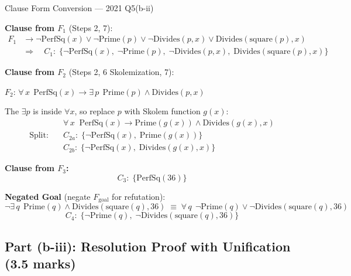 \documentclass[12pt,a4paper]{article}
\newcommand{\ALL}[1]{\forall\,#1\;}
\newcommand{\EX}[1]{\exists\,#1\;}
\newcommand{\ra}{\rightarrow}
\newcommand{\cl}[1]{\{#1\}}      %
\begin{document}
\begin{solbox}{Clause Form Conversion --- 2021 Q5(b-ii)}

\textbf{Clause from $F_1$} (Steps 2, 7):
\begin{align*}
  F_1 &\ra \neg\mathrm{PerfSq}(x) \lor \neg\mathrm{Prime}(p) \lor \neg\mathrm{Divides}(p,x) \lor \mathrm{Divides}(\mathrm{square}(p),x)\\
  &\Rightarrow \quad C_1: \;\cl{\neg\mathrm{PerfSq}(x),\;\neg\mathrm{Prime}(p),\;\neg\mathrm{Divides}(p,x),\;\mathrm{Divides}(\mathrm{square}(p),x)}
\end{align*}

\textbf{Clause from $F_2$} (Steps 2, 6 Skolemization, 7):

$F_2$: $\ALL{x}\,\mathrm{PerfSq}(x) \ra \EX{p}\,\mathrm{Prime}(p)\land\mathrm{Divides}(p,x)$

The $\exists p$ is inside $\forall x$, so replace $p$ with Skolem function $g(x)$:
\begin{align*}
  &\ALL{x}\;\mathrm{PerfSq}(x) \ra \mathrm{Prime}(g(x)) \land \mathrm{Divides}(g(x),x)\\
  \text{Split:}\quad
  &C_{2a}: \;\cl{\neg\mathrm{PerfSq}(x),\;\mathrm{Prime}(g(x))}\\
  &C_{2b}: \;\cl{\neg\mathrm{PerfSq}(x),\;\mathrm{Divides}(g(x),x)}
\end{align*}

\textbf{Clause from $F_3$:}
\[C_3: \;\cl{\mathrm{PerfSq}(36)}\]

\textbf{Negated Goal} (negate $F_{\text{goal}}$ for refutation):
\[\neg\EX{q}\,\mathrm{Prime}(q)\land\mathrm{Divides}(\mathrm{square}(q),36)
  \;\equiv\; \ALL{q}\,\neg\mathrm{Prime}(q) \lor \neg\mathrm{Divides}(\mathrm{square}(q),36)\]
\[C_4: \;\cl{\neg\mathrm{Prime}(q),\;\neg\mathrm{Divides}(\mathrm{square}(q),36)}\]
\end{solbox}

\subsection{Part (b-iii): Resolution Proof with Unification (3.5 marks)}
\end{document}

